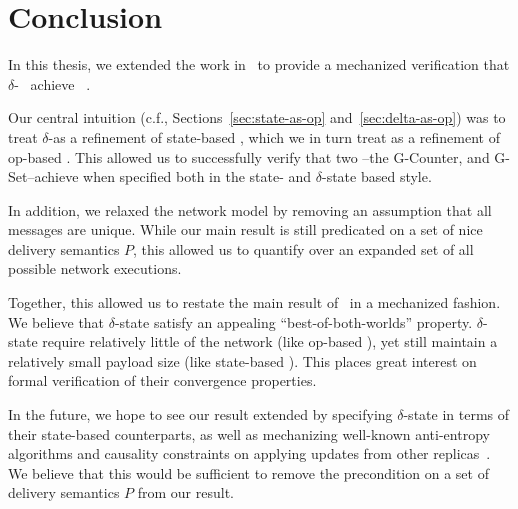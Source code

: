 \chapter{Conclusion}
\label{chap:conclusion}

In this thesis, we extended the work in~\citet{gomes17} to provide a mechanized
verification that $\delta$-\CRDTs~\citep{almedia18} achieve
\SEC~\citep{shapiro11}.

Our central intuition (c.f., Sections~\ref{sec:state-as-op}
and~\ref{sec:delta-as-op}) was to treat $\delta$-\CRDTs as a refinement of
state-based \CRDTs, which we in turn treat as a refinement of op-based \CRDTs.
This allowed us to successfully verify that two \CRDTs--the G-Counter, and
G-Set--achieve \SEC when specified both in the state- and $\delta$-state based
style.

In addition, we relaxed the network model by removing an assumption that all
messages are unique. While our main result is still predicated on a set of nice
delivery semantics $P$, this allowed us to quantify over an expanded set of all
possible network executions.

Together, this allowed us to restate the main result of~\citet{almedia18} in a
mechanized fashion. We believe that $\delta$-state \CRDTs satisfy an appealing
``best-of-both-worlds'' property. $\delta$-state \CRDTs require relatively
little of the network (like op-based \CRDTs), yet still maintain a relatively
small payload size (like state-based \CRDTs). This places great interest on
formal verification of their convergence properties.

In the future, we hope to see our result extended by specifying $\delta$-state
\CRDTs in terms of their state-based counterparts, as well as mechanizing
well-known anti-entropy algorithms and causality constraints on applying updates
from other replicas~\citep{almedia18}. We believe that this would be sufficient
to remove the precondition on a set of delivery semantics $P$ from our result.
